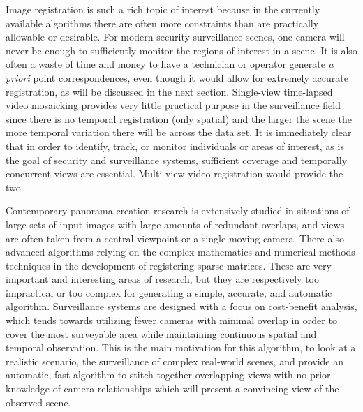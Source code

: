 %
%
%
%
%
%
%

%
%
%


Image registration is such a rich topic of interest because in the currently available algorithms there are often more constraints than are practically allowable or desirable. For modern security surveillance scenes, one camera will never be enough to sufficiently monitor the regions of interest in a scene. It is also often a waste of time and money to have a technician or operator generate \textit{a priori} point correspondences, even though it would allow for extremely accurate registration, as will be discussed in the next section. Single-view time-lapsed video mosaicking provides very little practical purpose in the surveillance field since there is no temporal registration (only spatial) and the larger the scene the more temporal variation there will be across the data set. It is immediately clear that in order to identify, track, or monitor individuals or areas of interest, as is the goal of security and surveillance systems, sufficient coverage and temporally concurrent views are essential. Multi-view video registration would provide the two.

Contemporary panorama creation research is extensively studied in situations of large sets of input images with large amounts of redundant overlaps, and views are often taken from a central viewpoint or a single moving camera. There also advanced algorithms relying on the complex mathematics and numerical methods techniques in the development of registering sparse matrices. These are very important and interesting areas of research, but they are respectively too impractical or too complex for generating a simple, accurate, and automatic algorithm. Surveillance systems are designed with a focus on cost-benefit analysis, which tends towards utilizing fewer cameras with minimal overlap in order to cover the most surveyable area while maintaining continuous spatial and temporal observation. This is the main motivation for this algorithm, to look at a realistic scenario, the surveillance of complex real-world scenes, and provide an automatic, fast algorithm to stitch together overlapping views with no prior knowledge of camera relationships which will present a convincing view of the observed scene.

